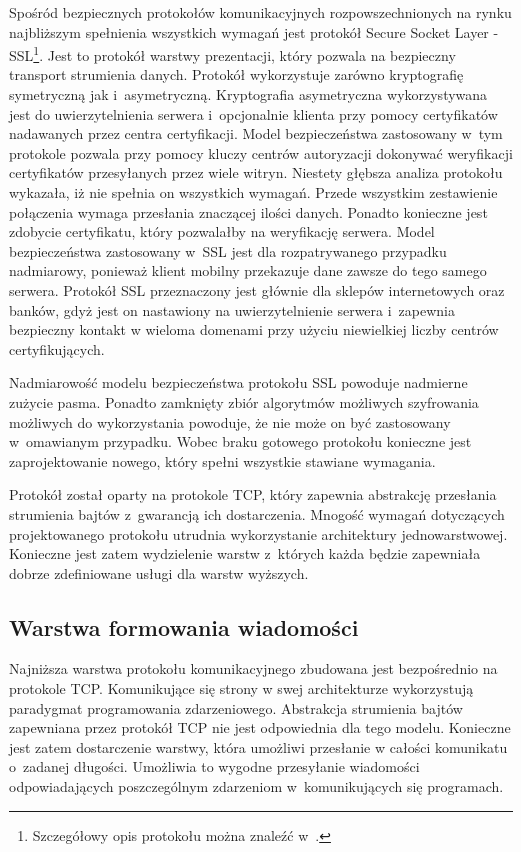 Spośród bezpiecznych protokołów komunikacyjnych rozpowszechnionych na
rynku najbliższym spełnienia wszystkich wymagań jest protokół Secure
Socket Layer - SSL\footnote{Szczegółowy opis protokołu można znaleźć
  w~\cite[148-155]{book:kryptografia}.}. Jest to protokół warstwy
prezentacji, który pozwala na bezpieczny transport strumienia
danych. Protokół wykorzystuje zarówno kryptografię symetryczną jak
i~asymetryczną. Kryptografia asymetryczna wykorzystywana jest do
uwierzytelnienia serwera i~opcjonalnie klienta przy pomocy
certyfikatów nadawanych przez centra certyfikacji. Model
bezpieczeństwa zastosowany w~tym protokole pozwala przy pomocy kluczy
centrów autoryzacji dokonywać weryfikacji certyfikatów przesyłanych
przez wiele witryn. Niestety głębsza analiza protokołu wykazała, iż
nie spełnia on wszystkich wymagań. Przede wszystkim zestawienie
połączenia wymaga przesłania znaczącej ilości danych. Ponadto
konieczne jest zdobycie certyfikatu, który pozwalałby na weryfikację
serwera. Model bezpieczeństwa zastosowany w~SSL jest dla
rozpatrywanego przypadku nadmiarowy, ponieważ klient mobilny
przekazuje dane zawsze do tego samego serwera. Protokół SSL
przeznaczony jest głównie dla sklepów internetowych oraz banków, gdyż
jest on nastawiony na uwierzytelnienie serwera i~zapewnia bezpieczny
kontakt w wieloma domenami przy użyciu niewielkiej liczby centrów
certyfikujących.

Nadmiarowość modelu bezpieczeństwa protokołu SSL powoduje nadmierne
zużycie pasma. Ponadto zamknięty zbiór algorytmów możliwych
szyfrowania możliwych do wykorzystania powoduje, że nie może on być
zastosowany w~omawianym przypadku. Wobec braku gotowego protokołu
konieczne jest zaprojektowanie nowego, który spełni wszystkie stawiane
wymagania.

Protokół został oparty na protokole TCP, który zapewnia abstrakcję
przesłania strumienia bajtów z~gwarancją ich dostarczenia. Mnogość
wymagań dotyczących projektowanego protokołu utrudnia wykorzystanie
architektury jednowarstwowej. Konieczne jest zatem wydzielenie warstw
z~których każda będzie zapewniała dobrze zdefiniowane usługi dla
warstw wyższych.
 

\subsection[Warstwa formowania wiadomości][Warstwa formowania wiadomości]{Warstwa formowania wiadomości}

Najniższa warstwa protokołu komunikacyjnego zbudowana jest
bezpośrednio na protokole TCP. Komunikujące się strony w swej
architekturze wykorzystują paradygmat programowania
zdarzeniowego. Abstrakcja strumienia bajtów zapewniana przez protokół
TCP nie jest odpowiednia dla tego modelu. Konieczne jest zatem
dostarczenie warstwy, która umożliwi przesłanie w całości komunikatu
o~zadanej długości. Umożliwia to wygodne przesyłanie wiadomości
odpowiadających poszczególnym zdarzeniom w~komunikujących się
programach.

